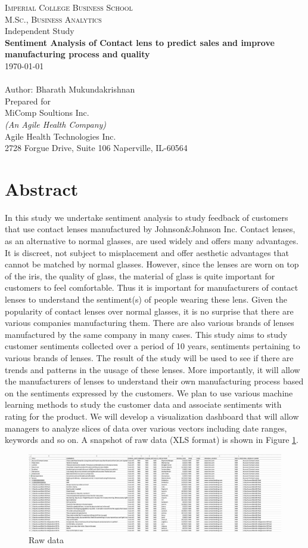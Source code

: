 \documentclass[12pt]{article}
\begin{document}
\begin{titlepage}
\center 
\textsc{\LARGE Imperial College Business School}\\[1.0cm]
\textsc{\Large M.Sc., Business Analytics}\\[0.5cm]
\large Independent Study \\[1.5cm] 
{\bfseries Sentiment Analysis of Contact lens to predict sales and improve manufacturing process and quality }\\
{\large \today }\\[2cm] 
{\large \textbf \\ Author: Bharath Mukundakrishnan}
{\large \textbf \\ Prepared for\\ MiComp Soultions Inc. \\\tiny \textit{(An Agile Health Company)}\\\large Agile Health Technologies Inc.\\2728 Forgue Drive, Suite 106 Naperville, IL-60564} 
\end{titlepage}

\section*{Abstract}
In this study we undertake sentiment analysis to study feedback of customers that use contact lenses manufactured by Johnson\&Johnson Inc. Contact lenses, as an alternative to normal glasses, are used widely and offers many advantages. It is discreet, not subject to misplacement and offer aesthetic advantages that cannot be matched by normal glasses. However, since the lenses are worn on top of the iris, the quality of glass, the material of glass is quite important for customers to feel comfortable. Thus it is important for manufacturers of contact lenses to understand the sentiment(s) of people wearing these lens. Given the popularity of contact lenses over normal glasses, it is no surprise that there are various companies manufacturing them. There are also various brands of lenses manufactured by the same company in many cases. This study aims to study customer sentiments collected over a period of 10 years, sentiments pertaining to various brands of lenses. The result of the study will be used to see if there are trends and patterns in the uusage of these lenses. More importantly, it will allow the manufacturers of lenses to understand their own manufacturing process based on the sentiments expressed by the customers. We plan to use various machine learning methods to study the customer data and associate sentiments with rating for the product. We will develop a visualization dashboard that will allow managers to analyze slices of data over various vectors including date ranges, keywords and so on. A snapshot of raw data (XLS format) is shown in Figure \ref{fig:raw_data}.

\begin{figure}
  \includegraphics[width=\linewidth]{raw_data.png}
  \caption{Raw data}
  \label{fig:raw_data}
\end{figure}
\end{document}

